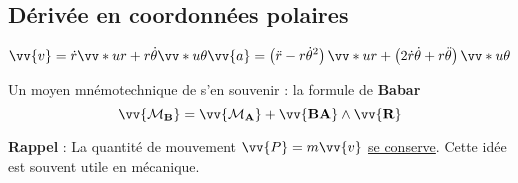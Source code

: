 \documentclass[11pt,a4paper,fleqn,pdftex]{report}
\begin{document}
\subsection{Dérivée en coordonnées polaires} %
\label{ssub:derivee_en_coord_polaire}
\begin{equation}
\vv{v} = \dot{r}\vv*{u}{r} + r \dot{\theta}\vv*{u}{\theta} \\
\vv{a} = \left( \ddot{r} - r\dot{\theta}^2\right)\vv*{u}{r} + \left( 2\dot{r}\dot{\theta} + r\ddot{\theta} \right) \vv*{u}{\theta}
\end{equation}
\begin{theorem}
Un moyen mnémotechnique de s'en souvenir : la formule de \og \textbf{Babar} \fg{}
\begin{equation}\label{Varignon}
\vv{\mathcal{M}_\textbf{B}}=\vv{\mathcal{M}_\textbf{A}}+\vv{\textbf{BA}} \wedge \vv{\mathcal{\textbf{R}}}
\end{equation}
\end{theorem}
%
\textbf{Rappel} : La quantité de mouvement $\vv{P}=m\vv{v}$ \uline{se conserve}. Cette idée est souvent utile en mécanique.
\end{document}
